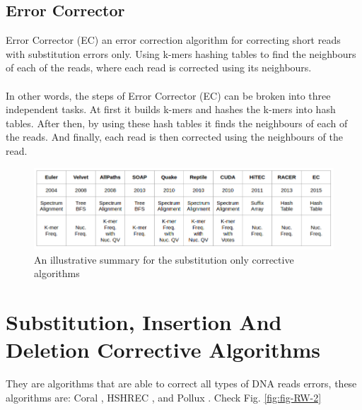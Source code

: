 \documentclass[12pt]{llncs}
\begin{document}
\subsection{Error Corrector}
Error Corrector (EC) \cite{EC} an error correction algorithm for correcting short reads with substitution errors only. Using k-mers hashing tables to find the neighbours of each of the reads, where each read is corrected using its neighbours.
\\
\\
In other words, the steps of Error Corrector (EC) can be broken into three independent tasks. At first it builds k-mers and hashes the k-mers into hash tables. After then, by using these hash tables it finds the neighbours of each of the reads. And finally, each read is then corrected using the neighbours of the read.

\begin{figure}
	\centering
	\includegraphics[width=.951\linewidth]{./figs/RW-1}
	\caption{\label{fig:fig-RW-1}An illustrative summary for the substitution only corrective algorithms}
\end{figure}


\section{Substitution, Insertion And Deletion Corrective Algorithms}
They are algorithms that are able to correct all types of DNA reads errors, these algorithms are: Coral \cite{Coral}, HSHREC \cite{HShrec}, and Pollux \cite{Pollux}. Check Fig. \ref{fig:fig-RW-2}
\end{document}
